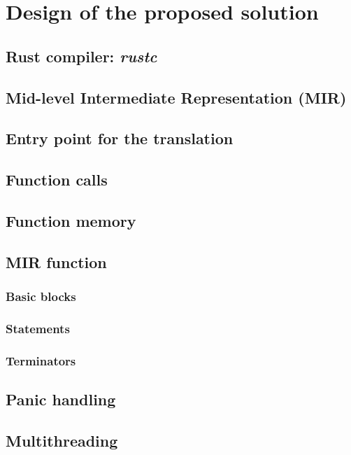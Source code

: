 \chapter{Design of the proposed solution}

\section{Rust compiler: \emph{rustc}}

\section{Mid-level Intermediate Representation (MIR)}

\section{Entry point for the translation}

\section{Function calls}

\section{Function memory}

\section{MIR function}

\subsection{Basic blocks}

\subsection{Statements}

\subsection{Terminators}

\section{Panic handling}

\section{Multithreading}

